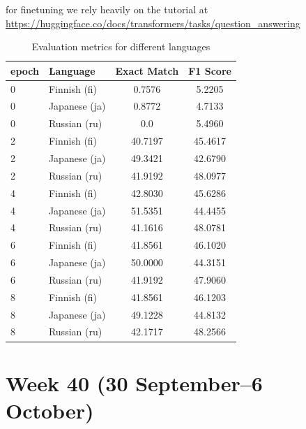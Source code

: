 \documentclass[11pt]{article}
\begin{document}
for finetuning we rely heavily on the tutorial at \url{https://huggingface.co/docs/transformers/tasks/question_answering}

\begin{table}[ht]
    \centering
    \begin{tabular}{|l|l|c|c|}
        \hline
        epoch & Language & Exact Match & F1 Score \\
        \hline
        0 & Finnish (fi) & 0.7576 & 5.2205 \\
        0 & Japanese (ja) & 0.8772 & 4.7133 \\
        0 & Russian (ru) & 0.0 & 5.4960 \\
        \hline
        2 & Finnish (fi) & 40.7197 & 45.4617 \\
        2 & Japanese (ja) & 49.3421 & 42.6790 \\
        2 & Russian (ru) & 41.9192 & 48.0977 \\
        \hline
        4 & Finnish (fi) & 42.8030 & 45.6286 \\
        4 & Japanese (ja) & 51.5351 & 44.4455 \\
        4 & Russian (ru) & 41.1616 & 48.0781 \\
        \hline
        6 & Finnish (fi) & 41.8561 & 46.1020 \\
        6 & Japanese (ja) & 50.0000 & 44.3151 \\
        6 & Russian (ru) & 41.9192 & 47.9060 \\
        \hline
        8 & Finnish (fi) & 41.8561 & 46.1203 \\
        8 & Japanese (ja) & 49.1228 & 44.8132 \\
        8 & Russian (ru) & 42.1717 & 48.2566 \\
        \hline
    \end{tabular}
    \caption{Evaluation metrics for different languages}
    \label{tab:evaluation_metrics}
\end{table}

\section{Week 40 (30 September--6 October)}
\end{document}

